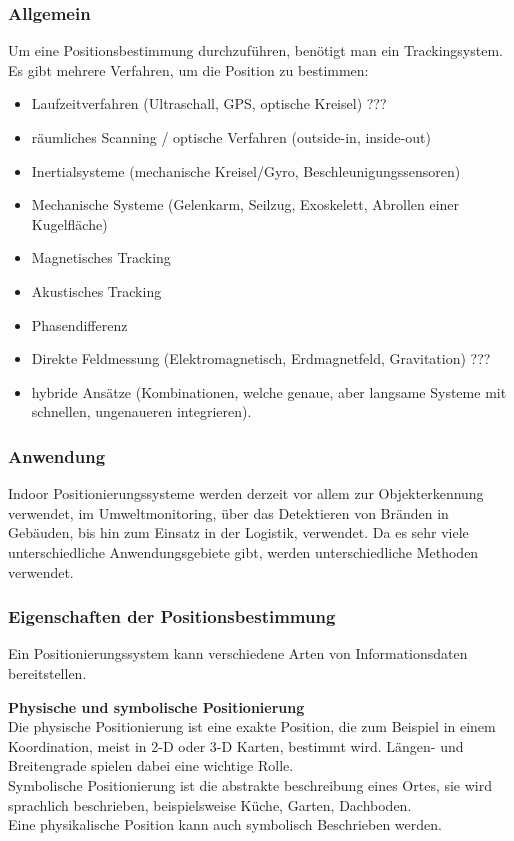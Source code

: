     \subsubsection{Allgemein}
    Um eine Positionsbestimmung durchzuführen, benötigt man ein Trackingsystem.
    Es gibt mehrere Verfahren, um die Position zu bestimmen: \cite{PositionAllg}
    \begin{itemize}
    \item Laufzeitverfahren (Ultraschall, GPS, optische Kreisel) ???
    \item räumliches Scanning / optische Verfahren (outside-in, inside-out)
    \item Inertialsysteme (mechanische Kreisel/Gyro, Beschleunigungssensoren)
    \item Mechanische Systeme (Gelenkarm, Seilzug, Exoskelett, Abrollen einer Kugelfläche)
    \item Magnetisches Tracking
    \item Akustisches Tracking
    \item Phasendifferenz
    \item Direkte Feldmessung (Elektromagnetisch, Erdmagnetfeld, Gravitation) ???
    \item hybride Ansätze (Kombinationen, welche genaue, aber langsame Systeme mit schnellen, ungenaueren integrieren).
    \end{itemize}

    \subsubsection{Anwendung}
    Indoor Positionierungssysteme werden derzeit vor allem zur Objekterkennung verwendet, im Umweltmonitoring, über das Detektieren von Bränden in Gebäuden, bis hin zum Einsatz in der Logistik, verwendet. Da es sehr viele unterschiedliche Anwendungsgebiete gibt, werden unterschiedliche Methoden verwendet. \cite{posAnwendung}

    \subsubsection{Eigenschaften der Positionsbestimmung}

    Ein Positionierungssystem kann verschiedene Arten von Informationsdaten bereitstellen. \cite{pos_eigenschaften}

    \textbf{Physische und symbolische Positionierung}\\
    Die physische Positionierung ist eine exakte Position, die zum Beispiel in einem Koordination, meist in 2-D oder 3-D Karten, bestimmt wird. Längen- und Breitengrade spielen dabei eine wichtige Rolle.\\
    Symbolische Positionierung ist die abstrakte beschreibung eines Ortes, sie wird sprachlich beschrieben, beispielsweise Küche, Garten, Dachboden.\\
    Eine physikalische Position kann auch symbolisch Beschrieben werden.

